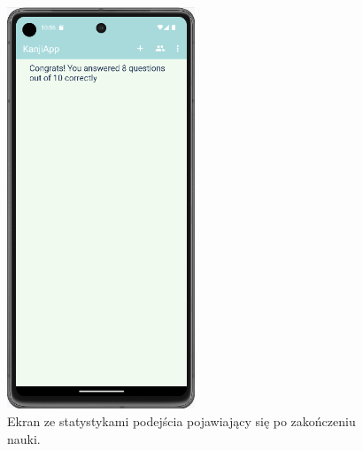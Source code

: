 \documentclass[a4paper,twoside,12pt]{book}
\begin{document}
\begin{figure}[]
\centering
\includegraphics[width=0.5\textwidth]{learn/stats}
\caption{Ekran ze statystykami podejścia pojawiający się po zakończeniu nauki.}
\label{fig:stats}
\end{figure}


\end{document}
